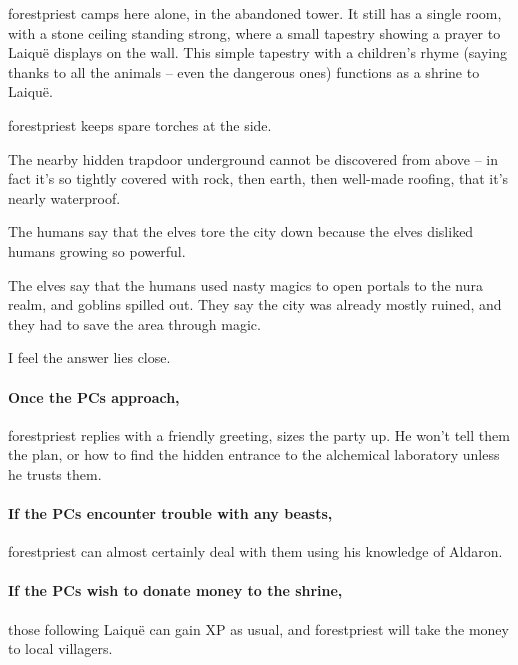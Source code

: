 \begin{multicols}{2}
\label{fallen_tower}

\Gls{forestpriest} camps here alone, in the abandoned tower.
It still has a single room, with a stone ceiling standing strong, where a small tapestry showing a prayer to Laiqu\"e displays on the wall.
This simple tapestry with a children's rhyme (saying thanks to all the animals -- even the dangerous ones) functions as a shrine to Laiqu\"e.

\Gls{forestpriest} keeps spare torches at the side.

The nearby hidden trapdoor underground cannot be discovered from above -- in fact it's so tightly covered with rock, then earth, then well-made roofing, that it's nearly waterproof.

\begin{speechtext}

  The humans say that the elves tore the city down because the elves disliked humans growing so powerful.

  The elves say that the humans used nasty magics to open portals to the nura realm, and goblins spilled out.
  They say the city was already mostly ruined, and they had to save the area through magic.

  I feel the answer lies close.

\end{speechtext}

\paragraph{Once the PCs approach,}
\gls{forestpriest} replies with a friendly greeting, sizes the party up.
He won't tell them the plan, or how to find the hidden entrance to the alchemical laboratory unless he trusts them.

\paragraph{If the PCs encounter trouble with any beasts,}
\gls{forestpriest} can almost certainly deal with them using his knowledge of Aldaron.

\paragraph{If the PCs wish to donate money to the shrine,}
those following Laiqu\"e can gain XP as usual, and \gls{forestpriest} will take the money to local villagers.



\end{multicols}
